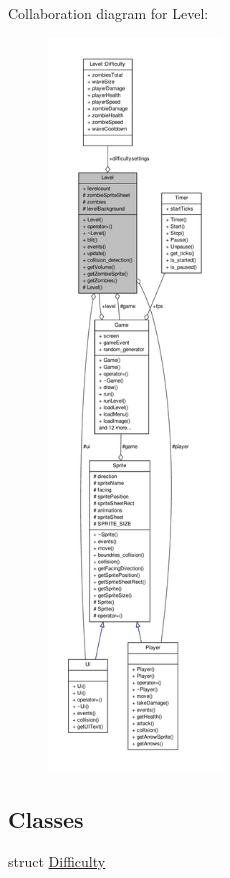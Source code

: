 Collaboration diagram for Level\-:
\nopagebreak
\begin{figure}[H]
\begin{center}
\leavevmode
\includegraphics[height=550pt]{classLevel__coll__graph}
\end{center}
\end{figure}
\subsection*{Classes}
\begin{DoxyCompactItemize}
\item 
struct \hyperlink{structLevel_1_1Difficulty}{Difficulty}
\end{DoxyCompactItemize}
